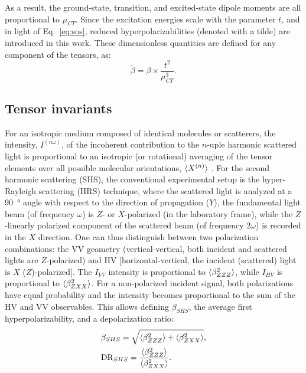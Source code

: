 \documentclass[journal=jpcafh]{achemso}
\begin{document}
As a result, the ground-state, transition, and excited-state dipole moments are all proportional to $ \mu_{CT}$. Since the excitation energies scale with the parameter $t$, and in light of Eq.~\eqref{eq:sos}, reduced hyperpolarizabilities (denoted with a tilde) are introduced in this work. These dimensionless quantities are defined for any component of the tensors, as:
\begin{equation}
	\tilde\beta = \beta \times \frac{t^2}{\mu_{CT}^3}. \label{eq:reduced}
\end{equation}

 
\subsection{Tensor invariants}

For an isotropic medium composed of identical molecules or scatterers, the intensity, $I^{(n\omega)}$, of the incoherent contribution to the $n$-uple harmonic scattered light is proportional to an isotropic (or rotational) averaging of the tensor elements over all possible molecular orientations, $\braket{X^{(n)}}$ \cite{Andrews1980,verbiest_second-order_2009,Castet2012,fordMolecularTensorAnalysis2018}.
For the second harmonic scattering (SHS), the conventional experimental setup is the hyper-Rayleigh scattering (HRS) technique\cite{verbiestSecondOrderNonlinearOptical2009}, where the scattered light is analyzed at a \SI{90}{\degree} angle with respect to the direction of propagation ($Y$), the fundamental light beam (of frequency $\omega$) is $Z$- or $X$-polarized (in the laboratory frame), while the $Z$-linearly polarized component of the scattered beam (of frequency $2\omega$) is recorded in the $X$ direction. One can thus distinguish between two polarization combinations: the VV geometry (vertical-vertical, both incident and scattered lights are $Z$-polarized) and HV [horizontal-vertical, the incident (scattered) light is $X$ ($Z$)-polarized]. The $I_{VV}$ intensity is proportional to $\braket{\beta_{ZZZ}^2}$, while $I_{HV}$ is proportional to $\braket{\beta_{ZXX}^2}$.
For a non-po\-la\-ri\-zed incident signal, both polarizations have equal probability and the intensity becomes proportional to the sum of the HV and VV observables. This allows defining $\beta_{SHS}$, the average first hyperpolarizability, and a depolarization ratio:\begin{align}
	&\beta_{SHS} = \sqrt{\braket{\beta_{ZZZ}^2}+\braket{\beta_{ZXX}^2}}, \nonumber\\
	&\text{DR}_{SHS} = \frac{\braket{\beta_{ZZZ}^2}}{\braket{\beta_{ZXX}^2}}.\label{eq:bhrs}
\end{align}
\end{document}
